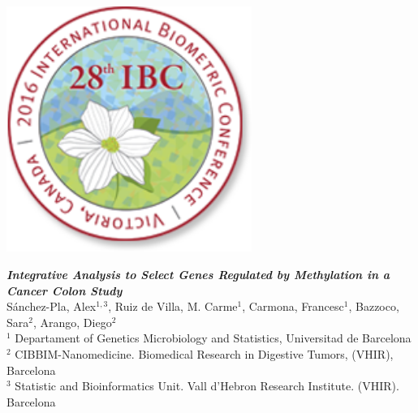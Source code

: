 
\colorbox{qmuldarkblue}{
 \color{white}
 
\begin{minipage}{0.2\textwidth}
\begin{center}
 \vskip 1cm
	
  \includegraphics[width=8cm]{images/IBSVictoria.png}

     \end{center}
     
\end{minipage}


\begin{minipage}{0.6\textwidth}
\vspace*{0.4cm}
\begin{center}
   \textrm
   {
    {\huge \bf \em Integrative Analysis to Select Genes Regulated by Methylation in a Cancer Colon Study}\\[1ex]
    {\large Sánchez-Pla, Alex$^{1,3}$, Ruiz de Villa, M. Carme$^1$, Carmona, Francesc$^1$, Bazzoco, Sara$^2$,  
Arango, Diego$^2$}\\[1ex]
    {\large $^1$ Departament of Genetics Microbiology and Statistics, Universitad de Barcelona\\
    $^2$ CIBBIM-Nanomedicine. Biomedical Research in Digestive Tumors, (VHIR), Barcelona\\
    $^3$ Statistic and Bioinformatics Unit. Vall d'Hebron Research Institute.  (VHIR). Barcelona}
   }
   \end{center}
   
\vspace*{0.4cm}
\end{minipage}

}
